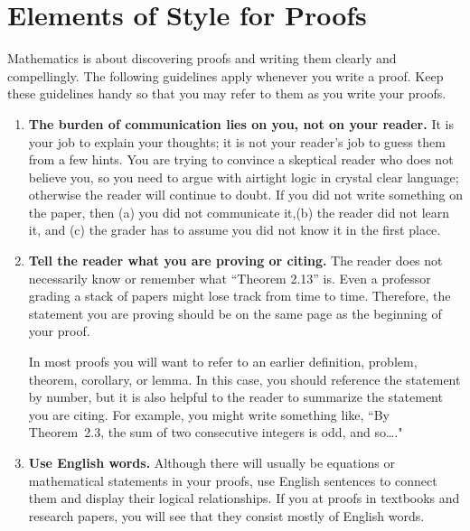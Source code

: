 \documentclass[11pt]{article}
\begin{document}
\section*{Elements of Style for Proofs}

Mathematics is about discovering proofs and writing them clearly and compellingly. The following guidelines apply whenever you write a proof.  Keep these guidelines handy so that you may refer to them as you write your proofs.

\begin{enumerate}

\item \textbf{The burden of communication lies on you, not on your reader.}
It is your job to explain your thoughts; it is not your reader's job to guess them from a few hints. You are trying to convince a skeptical reader who does not believe you, so you need to argue with airtight logic in crystal clear language; otherwise the reader will continue to doubt. If you did not write something on the paper, then (a) you did not communicate it,(b) the reader did not learn it, and (c) the grader has to assume you did not know it in the first place.
          
\item \textbf{Tell the reader what you are proving or citing.}
The reader does not necessarily know or remember what ``Theorem 2.13'' is. Even a professor grading a stack of papers might lose track from time to time. Therefore, the statement you are proving should be on the same page as the beginning of your proof. 

In most proofs you will want to refer to an earlier definition, problem, theorem, corollary, or lemma.  In this case, you should reference the statement by number, but it is also helpful to the reader to summarize the statement you are citing.  For example, you might write something like, ``By Theorem~2.3, the sum of two consecutive integers is odd, and so\ldots."

\item \textbf{Use English words.}
Although there will usually be equations or mathematical statements in your proofs, use English sentences to connect them and display their logical relationships. If you at proofs in textbooks and research papers, you will see that they consist mostly of English words.


\end{enumerate}
\end{document}
